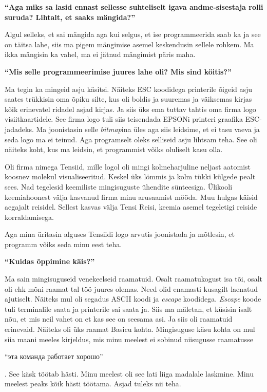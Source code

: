 \textbf{\enquote{Aga miks sa lasid ennast sellesse suhteliselt igava andme-sisestaja rolli suruda? Lihtalt, et saaks mängida?}}

Algul selleks, et sai mängida aga kui selgus, et ise programmeerida saab ka ja see on täitsa lahe, siis ma pigem mängimise asemel keskendusin sellele rohkem. Ma ikka mängisin ka vahel, ma ei jätnud mängimist päris maha. 

\textbf{\enquote{Mis selle programmeerimise juures lahe oli? Mis sind köitis?}}

Ma tegin ka mingeid asju käsitsi. Näiteks ESC koodidega printerile õigeid asju saates trükkisin oma õpiku silte, kus oli boldis ja suuremas ja väiksemas kirjas kõik erinevatel ridadel asjad kirjas. Ja siis üks ema tuttav tahtis oma firma logo visiitkaartidele. See firma logo tuli siis teisendada EPSONi printeri graafika ESC-jadadeks. Ma joonistasin selle \emph{bitmap}ina üles aga siis leidsime, et ei tasu vaeva ja seda logo ma ei teinud. Aga programselt oleks selliseid asju lihtsam teha. See oli näiteks koht, kus ma leidsin, et programmist võiks oluliselt kasu olla. 

Oli firma nimega Tensiid, mille logol oli mingi kolmeharjuline neljast aatomist koosnev molekul visualiseeritud. Keskel üks lömmis ja kolm tükki külgede pealt sees. Nad tegelesid keemiliste mingisuguste ühendite sünteesiga. Ülikooli keemiahoonest välja kasvanud firma minu arusaamist mööda. Muu hulgas käisid aegajalt reisidel. Sellest kasvas välja Tensi Reisi, keemia asemel tegeletigi reiside korraldamisega. 

Aga mina üritasin alguses Tensiidi logo arvutis joonistada ja mõtlesin, et programm võiks seda minu eest teha. 

\textbf{\enquote{Kuidas õppimine käis?}}

Ma sain mingisuguseid venekeelseid raamatuid. Osalt raamatukogust isa tõi, osalt oli ehk mõni raamat tal töö juures olemas.  Need olid enamasti kusagilt laenatud ajutiselt. Näiteks mul oli segadus ASCII koodi ja \emph{escape} koodidega. \emph{Escape} koode tuli terminalile saata ja printerile sai saata ja. Siis ma mäletan, et küsisin isalt nõu, et mis neil vahet on et kas see on seesama asi. Ja siis oli raamatuid erinevaid. Näiteks oli üks raamat Basicu kohta. Mingisuguse käsu kohta on mul siia maani meeles kirjeldus, mis minu meelest ei sobinud niisugusse raamatusse \begin{russian}\enquote{эта команда работает хорошо}\end{russian}. See käsk töötab hästi. Minu meelest oli see lati liiga madalale laskmine. Minu meelest peaks kõik hästi töötama. Asjad tuleks nii teha. 

